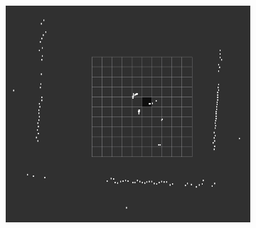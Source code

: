 \begin{figure}[H]
\begin{subfigure}[H]{0.5\textwidth}
		\includegraphics[width=\textwidth]{images/outside.png}
		\label{}
	\end{subfigure}%
	\quad
\end{figure}
